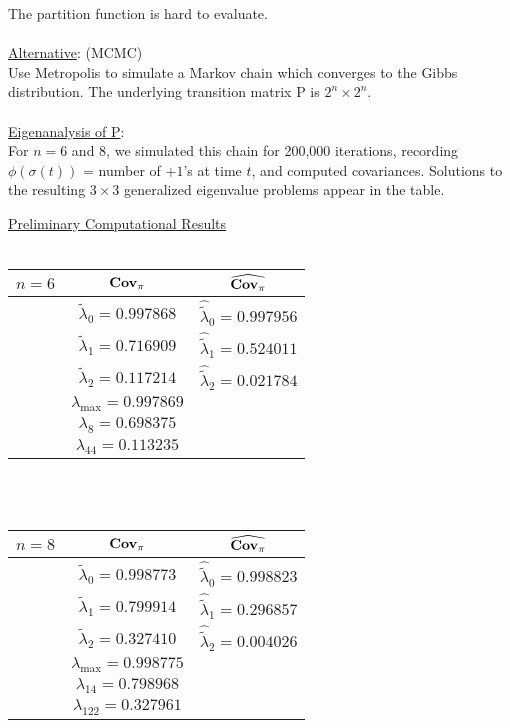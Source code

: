 \documentclass{slides}
\newcommand{\Cpi}{\mbox{{\bf Cov}}\ensuremath{_{\pi}}}
\begin{document}
\begin{slide}
The partition function is hard to evaluate.\\
\\
\underline{Alternative}: (MCMC) \\
Use Metropolis to simulate a Markov chain which 
converges to the Gibbs distribution.
The underlying transition matrix P is $2^n \times 2^n$. 
\\\\
\underline{Eigenanalysis of P}:\\
For $n=6$ and $8$, we simulated this chain for 200,000 iterations, 
recording $\phi(\sigma(t))$ = number of $+1$'s
at time $t$, and computed covariances.  Solutions to
the resulting $3 \times 3$ generalized eigenvalue problems appear
in the table.
\end{slide}

\begin{slide}
\underline{Preliminary Computational Results}
\\\\
\begin{tabular}{c|c|c}
$n=6$& $\Cpi$ & $\widehat{\Cpi}$\\
\hline
&$\tilde \lambda_0 = 0.997868 $ &$\hat{\tilde \lambda}_0 = 0.997956$\\
&$\tilde \lambda_1 = 0.716909 $ &$\hat{\tilde \lambda}_1 =0.524011$\\
&$\tilde \lambda_2 = 0.117214 $ &$\hat{\tilde \lambda}_2= 0.021784$ \\
\hline
& $\lambda_{\max} = 0.997869$ & \\
& $\lambda_8 =  0.698375$&\\
& $\lambda_{44} = 0.113235$&\\
\end{tabular}
\\\\

\begin{tabular}{c|c|c}
$n = 8$& $\Cpi$ & $\widehat{\Cpi}$\\
\hline
&$\tilde \lambda_0 = 0.998773$ &$\hat{ \tilde \lambda}_0 =  0.998823$ \\
&$\tilde \lambda_1 = 0.799914$ &$\hat{ \tilde \lambda}_1 =   0.296857$ \\
&$\tilde \lambda_2 = 0.327410$ &$\hat{ \tilde \lambda}_2 =   0.004026$ \\
\hline
& $\lambda_{\max} = 0.998775$ &\\
& $ \lambda_{14} = 0.798968$ & \\
& $ \lambda_{122} = 0.327961$ & 
\end{tabular}
\end{slide}
\end{document}
